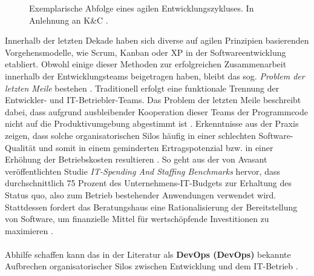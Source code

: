 \begin{center}
	\begin{figure}[H]\hspace*{-5mm}
		\centering
		\caption[Exemplarische Abfolge eines agilen Entwicklungszykluses]{Exemplarische Abfolge eines agilen Entwicklungszykluses. In Anlehnung an K\&C \cite{K&C.2021}.}
		\label{fig:Agile_Cycle}
	\end{figure}	
\end{center}
\vspace*{-15mm}
Innerhalb der letzten Dekade haben sich diverse auf agilen Prinzipien basierenden Vorgehensmodelle, wie Scrum, Kanban oder \ac{XP} in der Softwareentwicklung etabliert. Obwohl einige dieser Methoden zur erfolgreichen Zusammenarbeit innerhalb der Entwicklungsteams beigetragen haben, bleibt das sog.  \textit{Problem der letzten Meile} bestehen \cite{Qentelli.20230305}. Traditionell erfolgt eine funktionale Trennung der Entwickler- und IT-Betriebler-Teams. Das Problem der letzten Meile beschreibt dabei, dass aufgrund ausbleibender Kooperation dieser Teams der Programmcode nicht auf die Produktivumgebung abgestimmt ist \cite[17]{Huttermann.2012}. Erkenntnisse aus der Praxis zeigen, dass solche organisatorischen Silos häufig in einer schlechten Software-Qualität und somit in einem geminderten Ertragspotenzial bzw. in einer Erhöhung der Betriebskosten resultieren \cite[1]{Halstenberg.2020}. So geht aus der von Avasant veröffentlichten Studie \textit{IT-Spending And Staffing Benchmarks} hervor, dass durchschnittlich 75 Prozent des Unternehmens-IT-Budgets zur Erhaltung des Status quo, also zum Betrieb bestehender Anwendungen verwendet wird. Stattdessen fordert das Beratungshaus eine Rationalisierung der Bereitstellung von Software, um finanzielle Mittel für wertschöpfende Investitionen zu maximieren \cite[6]{Avasant.20220728}.\\\\ Abhilfe schaffen kann das in der Literatur als \textbf{\acl{DevOps} (Dev\-Ops)} bekannte Aufbrechen organisatorischer Silos zwischen Entwicklung und dem IT-Betrieb \cite[1]{Halstenberg.2020}. 
